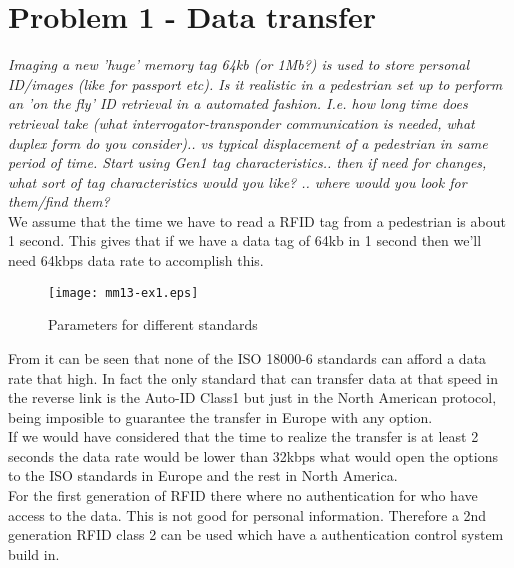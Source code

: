 \section{Problem 1 - Data transfer}
\textit{Imaging a new 'huge' memory tag 64kb (or 1Mb?) is used to store personal ID/images (like for passport etc). Is it realistic in a pedestrian set up to perform an 'on the fly' ID retrieval in a automated fashion. I.e. how long time does retrieval take (what interrogator-transponder communication is needed, what duplex form do you consider).. vs typical displacement of a pedestrian in same period of time. Start using Gen1 tag characteristics.. then if need for changes, what sort of tag characteristics would you like? .. where would you look for them/find them?}\\

We assume that the time we have to read a RFID tag from a pedestrian is about 1 second. This gives that if we have a data tag of 64kb in 1 second then we'll need 64kbps data rate to accomplish this. 

\begin{figure}
\centering
\texttt{[image: mm13-ex1.eps]}
\caption{Parameters for different standards}\label{fig:data_rates}
\end{figure}

From  it can be seen that none of the ISO 18000-6 standards can afford a data rate that high. In fact the only standard that can transfer data at that speed in the reverse link is the Auto-ID Class1 but just in the North American protocol, being imposible to guarantee the transfer in Europe with any option.\\

If we would have considered that the time to realize the transfer is at least 2 seconds the data rate would be lower than 32kbps what would open the options to the ISO standards in Europe and the rest in North America.\\

For the first generation of RFID there where no authentication for who have access to the data. This is not good for personal information. Therefore a 2nd generation RFID class 2 can be used which have a authentication control system build in. 